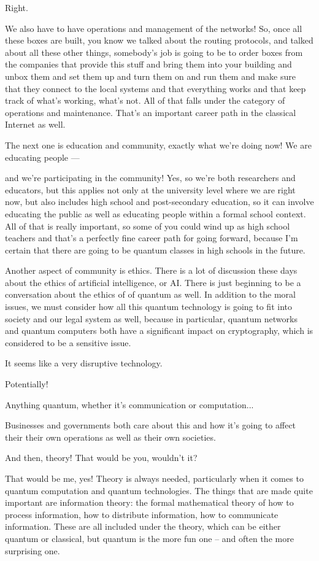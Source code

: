 \mmm Right.

\rrr We also have to have operations and management of the networks! So, once all these boxes are built, you know we talked about the routing protocols, and talked about all these other things, somebody's job is going to be to order boxes from the companies that provide this stuff and bring them into your building and unbox them and set them up and turn them on and run them and make sure that they connect to the local systems and that everything works and that keep track of what's working, what's not. All of that falls under the category of operations and maintenance. That's an important career path in the classical Internet as well.

\mmm The next one is education and community, exactly what we're doing now! We are educating people ---

\rrr and we're participating in the community! Yes, so we're both researchers and educators, but this applies not only at the university level where we are right now, but also includes high school and post-secondary education, so it can involve educating the public as well as educating people within a formal school context. All of that is really important, so some of you could wind up as high school teachers and that's a perfectly fine career path for going forward, because I'm certain that there are going to be quantum classes in high schools in the future.

Another aspect of community is ethics. There is a lot of discussion these days about the ethics of artificial intelligence, or AI. There is just beginning to be a conversation about the ethics of of quantum as well. In addition to the moral issues, we must consider how all this quantum technology is going to fit into society and our legal system as well, because in particular, quantum networks and quantum computers both have a significant impact on cryptography, which is considered to be a sensitive issue.

\mmm It seems like a very disruptive technology. 

\rrr Potentially!

\mmm Anything quantum, whether it's communication or computation...

\rrr Businesses and governments both care about this and how it's going to affect their their own operations as well as their own societies.

And then, theory! That would be you, wouldn't it?

\mmm That would be me, yes! Theory is always needed, particularly when it comes to quantum computation and quantum technologies. The things that are made quite important are information theory: the formal mathematical theory of how to process information, how to distribute information, how to communicate information. These are all included under the theory, which can be either quantum or classical, but quantum is the more fun one -- and often the more surprising one.

